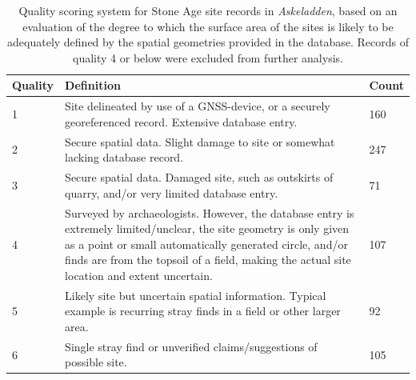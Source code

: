 \documentclass[12pt, a4paper]{article}
\begin{document}
\begin{table}
	\begin{center}
		\begin{tabular}{ | l | p{10cm} |  l |}
			\hline
			Quality & Definition & Count \\ \hline
			1 &Site delineated by use of a GNSS-device, or a securely georeferenced record.
			Extensive database entry. & 160 \\ \hline
			2 & Secure spatial data. Slight damage to site or somewhat lacking database record.  & 247 \\ \hline
			3 & Secure spatial data. Damaged site, such as outskirts of quarry,
			and/or very limited database entry.  & 71\\ \hline
			4 &  Surveyed by archaeologists. However, the
			database entry is extremely limited/unclear, the site geometry is only given as
			a point or small automatically generated circle, and/or finds are from the topsoil of a field, making 
			the actual site location and extent uncertain.  & 107 \\ \hline
			5 & Likely site but uncertain spatial information. Typical example
			is recurring stray finds in a field or other larger area.  & 92 \\ \hline
			6 &  Single stray find or unverified claims/suggestions of possible site.  & 105\\ \hline
			\hline
		\end{tabular}
			\caption[Quality scoring system for Stone Age site records in \textit{Askeladden}]{Quality scoring system for Stone Age site records in \textit{Askeladden}, based on an evaluation of the degree to which the surface area of the sites is likely to be adequately defined by the spatial geometries provided in the database. Records of quality 4 or below were excluded from further analysis.}
		\label{table:askeladden}
	\end{center}
\end{table}
\end{document}
